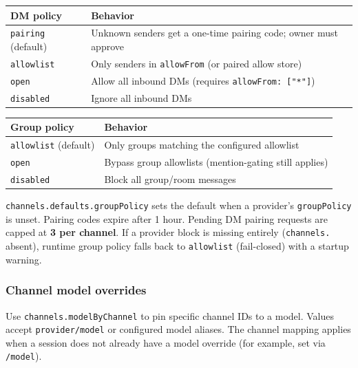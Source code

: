 \begin{table}[h]
\centering
\small
\begin{tabular}{|l|l|}
\hline
DM policy & Behavior \\
\hline
\texttt{pairing} (default) & Unknown senders get a one-time pairing code; owner must approve \\
\hline
\texttt{allowlist} & Only senders in \texttt{allowFrom} (or paired allow store) \\
\hline
\texttt{open} & Allow all inbound DMs (requires \texttt{allowFrom: ["*"]}) \\
\hline
\texttt{disabled} & Ignore all inbound DMs \\
\hline
\end{tabular}
\end{table}




\begin{table}[h]
\centering
\small
\begin{tabular}{|l|l|}
\hline
Group policy & Behavior \\
\hline
\texttt{allowlist} (default) & Only groups matching the configured allowlist \\
\hline
\texttt{open} & Bypass group allowlists (mention-gating still applies) \\
\hline
\texttt{disabled} & Block all group/room messages \\
\hline
\end{tabular}
\end{table}



\texttt{channels.defaults.groupPolicy} sets the default when a provider's \texttt{groupPolicy} is unset.
Pairing codes expire after 1 hour. Pending DM pairing requests are capped at \textbf{3 per channel}.
If a provider block is missing entirely (\texttt{channels.} absent), runtime group policy falls back to \texttt{allowlist} (fail-closed) with a startup warning.

\subsubsection{Channel model overrides}


Use \texttt{channels.modelByChannel} to pin specific channel IDs to a model. Values accept \texttt{provider/model} or configured model aliases. The channel mapping applies when a session does not already have a model override (for example, set via \texttt{/model}).

